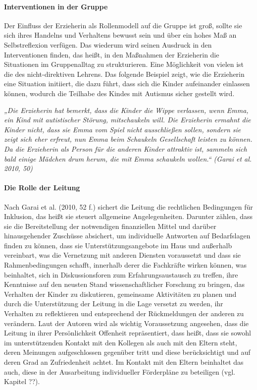 \paragraph{Interventionen in der Gruppe}
Der Einfluss der Erzieherin als Rollenmodell auf die Gruppe ist groß, sollte sie sich ihres Handelns und Verhaltens bewusst sein und über ein hohes Maß an Selbstreflexion verfügen. Das wiederum wird seinen Ausdruck in den Interventionen finden, das heißt, in den Maßnahmen der Erzieherin die Situationen im Gruppenalltag zu strukturieren. Eine Möglichkeit von vielen ist die des nicht-direktiven Lehrens. Das folgende Beispiel zeigt, wie die Erzieherin eine Situation initiiert, die dazu führt, dass sich die Kinder aufeinander einlassen können, wodurch die Teilhabe des Kindes mit Autismus sicher gestellt wird. 

\emph{„Die Erzieherin hat bemerkt, dass die Kinder die Wippe verlassen, wenn Emma, ein Kind mit autistischer Störung, mitschaukeln will. Die Erzieherin ermahnt die Kinder nicht, dass sie Emma vom Spiel nicht ausschließen sollen, sondern sie zeigt sich eher erfreut, nun Emma beim Schaukeln Gesellschaft leisten zu können. Da die Erzieherin als Person für die anderen Kinder attraktiv ist, sammeln sich bald einige Mädchen drum herum, die mit Emma schaukeln wollen.“ (Garai et al. 2010, 50)}

\paragraph{Die Rolle der Leitung}
Nach Garai et al. (2010, 52 f.) sichert die Leitung die rechtlichen Bedingungen für Inklusion, das heißt sie steuert allgemeine Angelegenheiten. Darunter zählen, dass sie die Bereitstellung der notwendigen finanziellen Mittel und darüber hinausgehender Zuschüsse absichert, um individuelle Antworten auf Bedarfslagen finden zu können, dass sie Unterstützungsangebote im Haus und außerhalb vereinbart, was die Vernetzung mit anderen Diensten voraussetzt und dass sie Rahmenbedingungen schafft, innerhalb derer die Fachkräfte wirken können, was beinhaltet, sich in Diskussionsforen zum Erfahrungsaustausch zu treffen, ihre Kenntnisse auf den neusten Stand wissenschaftlicher Forschung zu bringen, das Verhalten der Kinder zu diskutieren, gemeinsame Aktivitäten zu planen und durch die Unterstützung der Leitung in die Lage versetzt zu werden, ihr Verhalten zu reflektieren und entsprechend der Rückmeldungen der anderen zu verändern. Laut der Autoren wird als wichtig Voraussetzung angesehen, dass die Leitung in ihrer Persönlichkeit Offenheit repräsentiert, dass heißt, dass sie sowohl im unterstützenden Kontakt mit den Kollegen als auch mit den Eltern steht, deren Meinungen aufgeschlossen gegenüber tritt und diese berücksichtigt und auf deren Grad an Zufriedenheit  achtet. Im Kontakt mit den Eltern beinhaltet das auch, diese in der Ausarbeitung individueller Förderpläne zu beteiligen (vgl. Kapitel ??).

